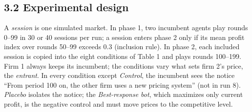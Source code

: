 \documentclass[11pt]{article}
\begin{document}
\hypertarget{experimental-design}{%
\subsection*{3.2 Experimental design}\label{experimental-design}}

A \emph{session} is one simulated market. In phase 1, two incumbent agents play rounds 0--99 in 30 or 40
sessions per run; a session enters phase 2 only if its mean profit index over rounds 50--99 exceeds
0.3 (inclusion rule). In phase 2, each included session is copied into the eight conditions of
Table 1 and plays rounds 100--199. Firm 1 always keeps its incumbent; the conditions vary what sets
firm 2's price, the \emph{entrant}. In every condition except \emph{Control}, the incumbent sees the notice
``From period 100 on, the other firm uses a new pricing system'' (not in run 8). \emph{Placebo} isolates
the notice; the \emph{Best-response bot}, which maximizes only current profit, is the negative control
and must move prices to the competitive level.
\end{document}
